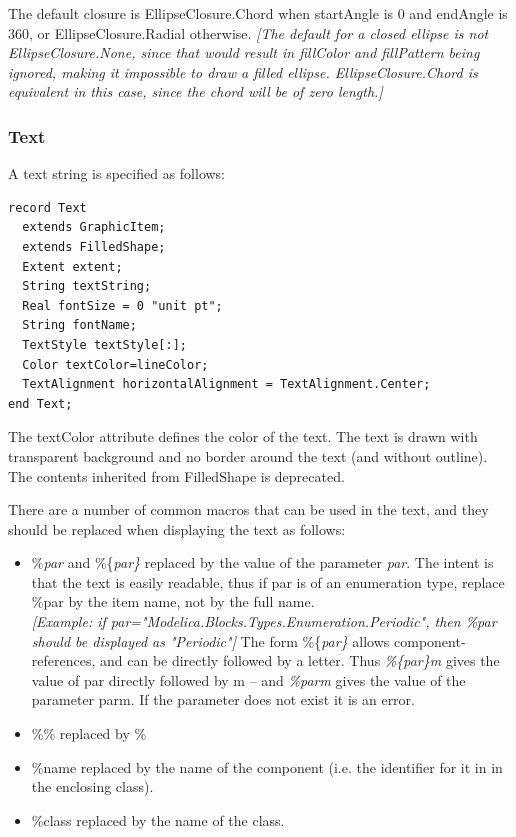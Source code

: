 \documentclass[10pt,a4paper]{report}
\def\doublelabel#1{\label{#1}\hypertarget{#1}{}}
\begin{document}
The default closure is EllipseClosure.Chord when startAngle is 0 and
endAngle is 360, or EllipseClosure.Radial otherwise. \emph{{[}The
default for a closed ellipse is not EllipseClosure.None, since that
would result in fillColor and fillPattern being ignored, making it
impossible to draw a filled ellipse. EllipseClosure.Chord is equivalent
in this case, since the chord will be of zero length.{]}}

\subsubsection{Text}\doublelabel{text}

A text string is specified as follows:

\begin{lstlisting}[language=modelica]
record Text
  extends GraphicItem;
  extends FilledShape;
  Extent extent;
  String textString;
  Real fontSize = 0 "unit pt";
  String fontName;
  TextStyle textStyle[:];
  Color textColor=lineColor;
  TextAlignment horizontalAlignment = TextAlignment.Center;
end Text;
\end{lstlisting}
The textColor attribute defines the color of the text. The text is drawn
with transparent background and no border around the text (and without
outline). The contents inherited from FilledShape is deprecated.

There are a number of common macros that can be used in the text, and
they should be replaced when displaying the text as follows:

\begin{itemize}
\item
  \%\emph{par} and \%\{\emph{par\}} replaced by the value of the
  parameter \emph{par}. The intent is that the text is easily readable,
  thus if par is of an enumeration type, replace \%par by the item name,
  not by the full name.\\
  \emph{{[}Example: if par="Modelica.Blocks.Types.Enumeration.Periodic",
  then \%par should be displayed as "Periodic"{]}} The form
  \%\{\emph{par\}} allows component-references, and can be directly
  followed by a letter. Thus \emph{\%\{par\}m} gives the value of par
  directly followed by m -- and \emph{\%parm} gives the value of the
  parameter parm. If the parameter does not exist it is an error.
\item
  \%\% replaced by \%
\item
  \%name replaced by the name of the component (i.e. the identifier for
  it in in the enclosing class).
\item
  \%class replaced by the name of the class.
\end{itemize}
\end{document}
